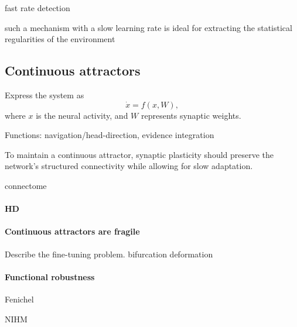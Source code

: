 \documentclass{article}
\theoremstyle{definition} \newtheorem{definition}{Definition}
\theoremstyle{remark} \newtheorem{remark}{Remark}
\newcounter{ct}
\begin{document}
fast rate detection\citep{zenke2013synaptic}

such a mechanism with a slow learning rate is ideal for extracting the statistical regularities of the environment \citep{panichello2019error}








\subsection{Continuous attractors}
Express the system as 
\begin{equation}
\dot x = f(x,W),
\end{equation} where $x$ is the neural activity, and $W$ represents synaptic weights.

Functions: navigation/head-direction\citep{wilson2023navigation, skaggs1994model}, evidence integration\citep{mante2013context, esnaola2022flexible}

To maintain a continuous attractor, synaptic plasticity should preserve the network’s structured connectivity while allowing for slow adaptation.
\citep{cannon1983oculomotor}
\citep{samsonovich1997pathintegration}

connectome \citep{kakaria2017ra}

\paragraph{HD}
\citep{skaggs1994model, redish1996coupled, boucheny2005continuous}
\citep{stentiford2022spiking}
\citep{barak2021mapping}

\paragraph{Continuous attractors are fragile}
Describe the fine-tuning problem.
bifurcation \citep{dercole2011dynamical}
deformation \citep{goodridge2000modeling}

\paragraph{Functional robustness}

Fenichel

NIHM
\end{document}
